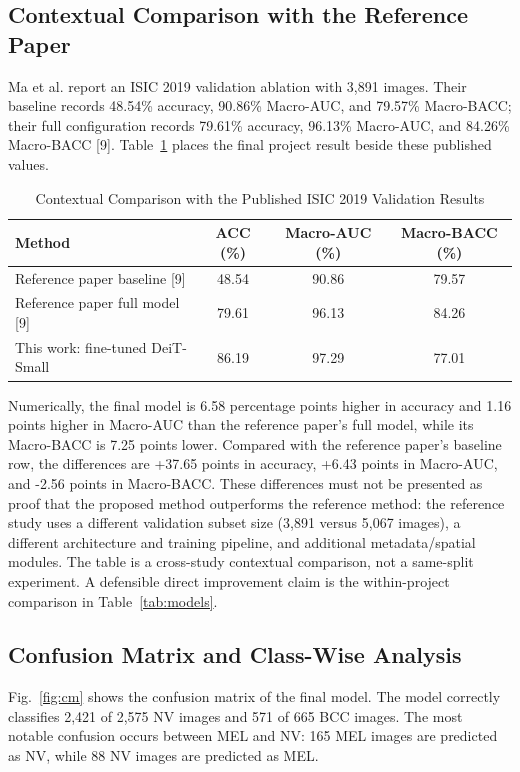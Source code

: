 \documentclass[conference]{IEEEtran}
\begin{document}
\subsection{Contextual Comparison with the Reference Paper}
Ma et al. report an ISIC 2019 validation ablation with 3,891 images. Their baseline records 48.54\% accuracy, 90.86\% Macro-AUC, and 79.57\% Macro-BACC; their full configuration records 79.61\% accuracy, 96.13\% Macro-AUC, and 84.26\% Macro-BACC [9]. Table~\ref{tab:literature} places the final project result beside these published values.

\begin{table}[!t]
\caption{Contextual Comparison with the Published ISIC 2019 Validation Results}
\label{tab:literature}
\centering
\scriptsize
\begin{tabular}{lccc}
\toprule
\textbf{Method} & \textbf{ACC (\%)} & \textbf{Macro-AUC (\%)} & \textbf{Macro-BACC (\%)}\\
\midrule
Reference paper baseline [9] & 48.54 & 90.86 & 79.57\\
Reference paper full model [9] & 79.61 & 96.13 & 84.26\\
This work: fine-tuned DeiT-Small & 86.19 & 97.29 & 77.01\\
\bottomrule
\end{tabular}
\end{table}

Numerically, the final model is 6.58 percentage points higher in accuracy and 1.16 points higher in Macro-AUC than the reference paper's full model, while its Macro-BACC is 7.25 points lower. Compared with the reference paper's baseline row, the differences are +37.65 points in accuracy, +6.43 points in Macro-AUC, and -2.56 points in Macro-BACC. These differences must not be presented as proof that the proposed method outperforms the reference method: the reference study uses a different validation subset size (3,891 versus 5,067 images), a different architecture and training pipeline, and additional metadata/spatial modules. The table is a cross-study contextual comparison, not a same-split experiment. A defensible direct improvement claim is the within-project comparison in Table~\ref{tab:models}.

\subsection{Confusion Matrix and Class-Wise Analysis}
Fig.~\ref{fig:cm} shows the confusion matrix of the final model. The model correctly classifies 2,421 of 2,575 NV images and 571 of 665 BCC images. The most notable confusion occurs between MEL and NV: 165 MEL images are predicted as NV, while 88 NV images are predicted as MEL.
\end{document}
